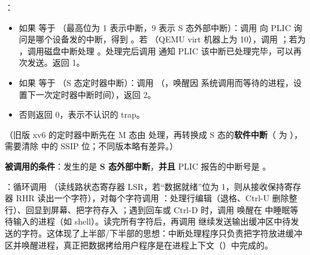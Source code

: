 \textbf{}：
\begin{itemize}
    \item 如果  等于 （最高位为 1 表示中断，9 表示 S 态外部中断）：调用  向 PLIC 询问是哪个设备发的中断，得到 。若 （QEMU virt 机器上为 10），调用 ；若为 ，调用磁盘中断处理 。处理完后调用  通知 PLIC 该中断已处理完毕，可以再次发送。返回 1。
    \item 如果  等于 （S 态定时器中断）：调用 （，唤醒因  系统调用而等待的进程，设置下一次定时器中断时间），返回 2。
    \item 否则返回 0，表示不认识的 trap。
\end{itemize}
（旧版 xv6 的定时器中断先在 M 态由  处理，再转换成 S 态的\textbf{软件中断}（ 为 ），需要清除  中的 SSIP 位；不同版本略有差异。）

\textbf{ 被调用的条件}：发生的是 \textbf{S 态外部中断}，\textbf{并且} PLIC 报告的中断号是 。

\textbf{}：循环调用 （读线路状态寄存器 LSR，若“数据就绪”位为 1，则从接收保持寄存器 RHR 读出一个字符），对每个字符调用 ：处理行编辑（退格、Ctrl-U 删除整行）、回显到屏幕、把字符存入 ；遇到回车或 Ctrl-D 时，调用  唤醒在  中睡眠等待输入的进程（如 shell）。读完所有字符后，再调用  继续发送输出缓冲区中待发送的字符。这体现了上半部/下半部的思想：中断处理程序只负责把字符放进缓冲区并唤醒进程，真正把数据拷给用户程序是在进程上下文（）中完成的。
